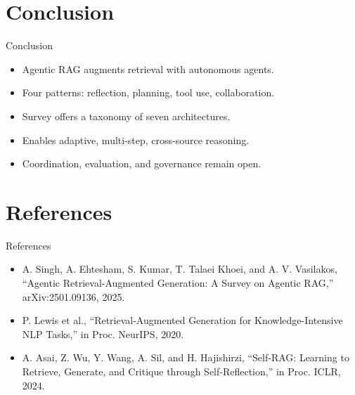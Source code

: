\documentclass{beamer}
\begin{document}
\section{Conclusion}
\begin{frame}{Conclusion}
\begin{itemize}
\item Agentic RAG augments retrieval with autonomous agents.
\item Four patterns: reflection, planning, tool use, collaboration.
\item Survey offers a taxonomy of seven architectures.
\item Enables adaptive, multi-step, cross-source reasoning.
\item Coordination, evaluation, and governance remain open.
\end{itemize}
\end{frame}

\section{References}
\begin{frame}{References}
\footnotesize
\begin{itemize}
\item A. Singh, A. Ehtesham, S. Kumar, T. Talaei Khoei, and A. V. Vasilakos, ``Agentic Retrieval-Augmented Generation: A Survey on Agentic RAG,'' arXiv:2501.09136, 2025.
\item P. Lewis et al., ``Retrieval-Augmented Generation for Knowledge-Intensive NLP Tasks,'' in Proc. NeurIPS, 2020.
\item A. Asai, Z. Wu, Y. Wang, A. Sil, and H. Hajishirzi, ``Self-RAG: Learning to Retrieve, Generate, and Critique through Self-Reflection,'' in Proc. ICLR, 2024.
\end{itemize}
\end{frame}
\begin{frame}\vfill{}\vfill\end{frame}
\end{document}
